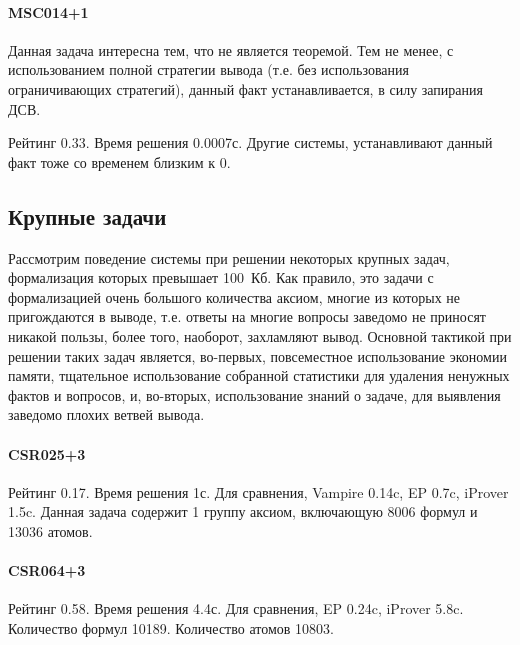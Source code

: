 \paragraph{MSC014+1}
Данная задача интересна тем, что не является теоремой. Тем не менее, с использованием полной стратегии вывода (т.е. без использования ограничивающих стратегий), данный факт устанавливается, в силу запирания ДСВ.

Рейтинг 0.33. Время решения 0.0007с. Другие системы, устанавливают данный факт тоже со временем близким к 0.





\subsection{Крупные задачи}

Рассмотрим поведение системы при решении некоторых крупных задач, формализация которых превышает 100~Кб. Как правило, это задачи с формализацией очень большого количества аксиом, многие из которых не пригождаются в выводе, т.е. ответы на многие вопросы заведомо не приносят никакой пользы, более того, наоборот, захламляют вывод. Основной тактикой при решении таких задач является, во-первых, повсеместное использование экономии памяти, тщательное использование собранной статистики для удаления ненужных фактов и вопросов, и, во-вторых, использование знаний о задаче, для выявления заведомо плохих ветвей вывода.

\paragraph{CSR025+3}
Рейтинг 0.17. Время решения 1с. Для сравнения, Vampire 0.14c, EP 0.7c, iProver 1.5c.
Данная задача содержит 1 группу аксиом, включающую 8006 формул и 13036 атомов.

\paragraph{CSR064+3}
Рейтинг 0.58. Время решения 4.4с. Для сравнения, EP 0.24c, iProver 5.8c.
Количество формул 10189. Количество атомов 10803.

